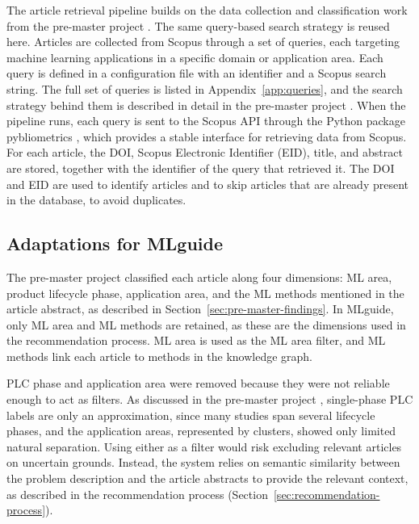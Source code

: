 The article retrieval pipeline builds on the data collection and
classification work from the pre-master project
\parencite{bergsto2026mlselection}. The same query-based search
strategy is reused here. Articles are collected from Scopus through a set of queries, each
targeting machine learning applications in a specific domain or
application area. Each query is defined in a configuration
file with an identifier and a Scopus search string. The full set
of queries is listed in Appendix~\ref{app:queries}, and the search
strategy behind them is described in detail in the pre-master project
\parencite{bergsto2026mlselection}. When the pipeline runs, each
query is sent to the Scopus API \parencite{scopus_api} through the
Python package pybliometrics \parencite{pybliometrics_rose_kitchin_2019}, which
provides a stable interface for retrieving data from Scopus. For
each article, the DOI, Scopus Electronic Identifier (EID), title, and abstract are stored,
together with the identifier of the query that retrieved it. The
DOI and EID are used to identify articles and to skip articles
that are already present in the database, to avoid duplicates.

\subsection{Adaptations for MLguide}
\label{sec:adaptations-for-mlguide}

The pre-master project classified each article along four
dimensions: ML area, product lifecycle phase,
application area, and the ML methods mentioned in the 
article abstract,
as described in Section~\ref{sec:pre-master-findings}.
In MLguide, 
only ML area and ML methods are retained, as these are 
the dimensions used in the recommendation process. ML area 
is used as the ML area filter, and ML methods link each 
article to methods in the knowledge graph.

PLC phase and application area were removed because they were
not reliable enough to act as filters. As discussed in the pre-master 
project \parencite{bergsto2026mlselection},
single-phase PLC labels are only an approximation, since many studies span
several lifecycle phases, and the application areas, represented by clusters,
showed only limited natural separation. Using either as a filter would risk excluding
relevant articles on uncertain grounds. Instead, the system relies
on semantic similarity between the problem description and the
article abstracts to provide the relevant context, as described in
the recommendation process (Section~\ref{sec:recommendation-process}).

